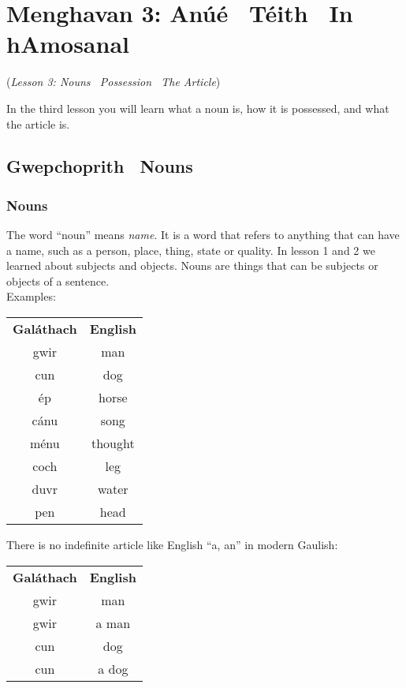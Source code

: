 \section{Menghavan 3: An\'{u}\'{e} \textendash\ T\'{e}ith \textendash\ In hAmosanal}
(\textit{Lesson 3: Nouns \textendash\ Possession \textendash\ The Article})

In the third lesson you will learn what a noun is, how it is possessed, and what the article is.\\

\subsection{Gwepchoprith \textendash\ Nouns}
\subsubsection{Nouns}

The word ``noun'' means \textit{name}. It is a word that refers to anything that can have a name, such as a person, place, thing, state or quality. In lesson 1 and 2 we learned about subjects and objects. Nouns are things that can be subjects or objects of a sentence.\\

Examples:
\begin{table}[H]
\centering
\begin{tabular}{cc}
  \toprule
  \textbf{Gal\'{a}thach} & \textbf{English}\\
  \cmidrule(lr){1-1}\cmidrule(lr){2-2}
  gwir & man\\
  cun & dog\\
  \'{e}p & horse\\
  c\'{a}nu & song\\
  m\'{e}nu & thought\\
  coch & leg\\
  duvr & water\\
  pen & head\\
  \bottomrule
\end{tabular}
\label{examples_nouns}
\end{table}

There is no indefinite article like English ``a, an'' in modern Gaulish:
\begin{table}[H]
\centering
\begin{tabular}{cc}
  \toprule
  \textbf{Gal\'{a}thach} & \textbf{English}\\
  \cmidrule(lr){1-1}\cmidrule(lr){2-2}
  gwir & man\\
  gwir & a man\\
  cun & dog\\
  cun & a dog\\
  \bottomrule
\end{tabular}
\label{examples_no_indefinite_article}
\end{table}

